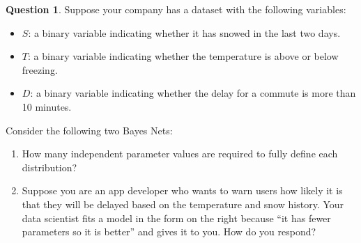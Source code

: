 \documentclass{article}
\theoremstyle{definition}
\newtheorem{question}[thm]{Question}
\begin{document}
\begin{question}
Suppose your company has a dataset with the following variables:
\begin{itemize}[noitemsep]
    \item $S$: a binary variable indicating whether it has snowed in the last two days.
    \item $T$: a binary variable indicating whether the temperature is above or below freezing.
    \item $D$: a binary variable indicating whether the delay for a commute is more than 10 minutes.
\end{itemize}

Consider the following two Bayes Nets:

\begin{multicols}{2}
    \begin{center}

    \end{center}  
\end{multicols}

\begin{enumerate}[label=(\alph*)]
    \item How many independent parameter values are required to fully define each distribution?
    \item Suppose you are an app developer who wants to warn users how likely it is that they will be delayed based on the temperature and snow history. Your data scientist fits a model in the form on the right because ``it has fewer parameters so it is better'' and gives it to you. How do you respond?
\end{enumerate}

\end{question}
\end{document}
